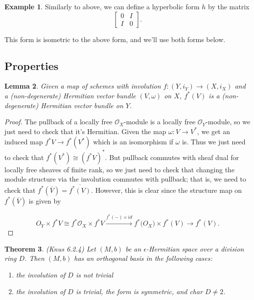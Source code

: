 \documentclass[edeposit,fullpage]{uiucthesis2009}
\newcommand{\mc}{\mathcal}
\theoremstyle{plain}
\newtheorem{lemma}{Lemma}
\numberwithin{lemma}{section}
\newtheorem{theorem}[lemma]{Theorem}
\theoremstyle{definition}
\newtheorem{example}[lemma]{Example}
\begin{document}
\begin{example}
Similarly to above, we can define a hyperbolic form $h$ by the matrix
\[
\begin{bmatrix}
0 & I\\
I & 0
\end{bmatrix}.
\]

This form is isometric to the above form, and we'll use both forms below.
\end{example}

\subsection{Properties}

\begin{lemma}
Given a map of schemes with involution $f : (Y,i_Y) \rightarrow (X,i_X)$
and a (non-degenerate) Hermitian vector bundle $(V,\omega)$ on $X$, $f^*(V)$ is
a (non-degenerate) Hermitian
vector bundle on $Y$.
\end{lemma}


\begin{proof}
The pullback of a locally free $\mc O_X$-module is a locally free $\mc
O_Y$-module, so we just need to check that it's Hermitian. Given the
map $\omega : V \rightarrow V^*$, we get an induced map $f^*V
\rightarrow f^*(V^*)$ which is an isomorphism if $\omega$ is. Thus we
just need to check that $f^*(V^*) \cong (f^*V)^*$. But pullback
commutes with sheaf dual for locally free sheaves of finite rank, so
we just need to check that changing the module structure via the
involution commutes with pullback; that is, we need to check that
$f^*(\overline V) = \overline{f^*(V)}$. However, this is clear since
the structure map on $f^*(\overline V)$ is given by

\[
O_Y \times f^*V \cong f^* \mc O_X \times f^*V \xrightarrow{f^*(-) \times id} f^*\mc(O_X) \times f^*(V)
\rightarrow f^*(V).
\]
\end{proof}

\begin{theorem} (Knus \cite{HermKnus} 6.2.4)
Let $(M,b)$ be an $\epsilon$-Hermitian space over a division ring
$D$. Then $(M,b)$ has an orthogonal basis in the following cases:
\begin{enumerate}
\item the involution of $D$ is not trivial
\item the involution of $D$ is trivial, the form is symmetric, and
  char $D \neq 2$.
\end{enumerate}
\end{theorem}
\end{document}
